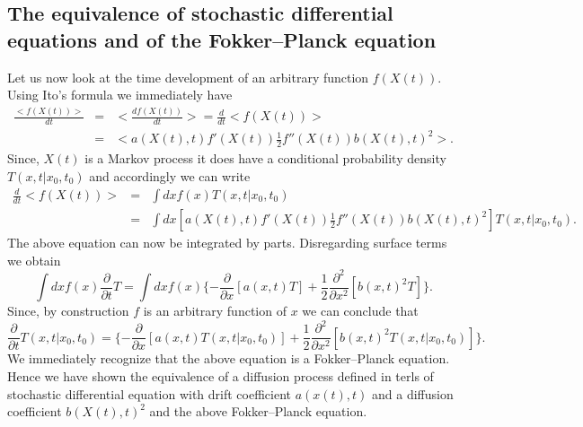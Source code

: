 \subsection{The equivalence of stochastic differential equations 
and of the Fokker--Planck equation}
Let us now look at the time development of an arbitrary function
$f(X(t))$.
Using Ito's formula we immediately have
\begin{eqnarray*}
\frac{<f(X(t))>}{dt} & = & <\frac{df(X(t))}{dt}> = 
               \frac{d}{dt} <f(X(t)) > \\
       & = & < a(X(t),t) f'(X(t))   \frac{1}{2} f''(X(t)) b(X(t),t)^2   >.
\end{eqnarray*} 
Since, $X(t)$ is a Markov process it does have a conditional
probability density $T(x,t|x_0,t_0)$ and accordingly we can write
\begin{eqnarray*}
\frac{d}{dt} <f(X(t)) > &=& \int dx f(x) T(x,t|x_0,t_0) \\
          & = & \int dx 
       [a(X(t),t) f'(X(t))   \frac{1}{2} f''(X(t)) b(X(t),t)^2] T(x,t|x_0,t_0).
\end{eqnarray*}
The above equation can now be integrated by parts. Disregarding
surface terms we obtain
\begin{equation*}
\int dx f(x) \frac{\partial}{\partial t} T = \int dx f(x)
   \{ - \frac{\partial}{\partial x}[a(x,t)T] + \frac{1}{2} 
        \frac{\partial^2}{\partial x^2}[b(x,t)^2 T] \}.
\end{equation*}
Since, by construction $f$ is an arbitrary function of $x$ we can
conclude that
\begin{equation*}
 \frac{\partial}{\partial t} T(x,t|x_0,t_0) =
   \{ - \frac{\partial}{\partial x}[a(x,t)T(x,t|x_0,t_0)] + \frac{1}{2} 
        \frac{\partial^2}{\partial x^2}[b(x,t)^2 T(x,t|x_0,t_0)] \}.
\end{equation*}
We immediately recognize that the above equation is a Fokker--Planck
equation. Hence we have shown the equivalence of a diffusion
process defined in terls of stochastic differential equation with
drift coefficient $a(x(t),t)$ and a diffusion coefficient
$b(X(t),t)^2$ and the above Fokker--Planck equation.

